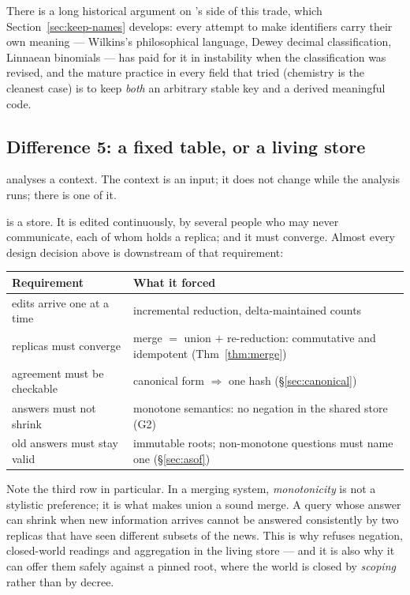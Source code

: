 There is a long historical argument on \odag{}'s side of this trade, which
Section~\ref{sec:keep-names} develops: every attempt to make identifiers carry
their own meaning --- Wilkins's philosophical language, Dewey decimal
classification, Linnaean binomials --- has paid for it in instability when the
classification was revised, and the mature practice in every field that tried
(chemistry is the cleanest case) is to keep \emph{both} an arbitrary stable
key and a derived meaningful code.

\subsection{Difference 5: a fixed table, or a living store}
\label{sec:mergeability}

\fca{} analyses a context. The context is an input; it does not change while
the analysis runs; there is one of it.

\odag{} is a store. It is edited continuously, by several people who may never
communicate, each of whom holds a replica; and it must converge. Almost every
design decision above is downstream of that requirement:

\begin{center}\small
\begin{tabularx}{\textwidth}{@{}p{4.6cm} X@{}}
\toprule
\textbf{Requirement} & \textbf{What it forced}\\
\midrule
edits arrive one at a time & incremental reduction, delta-maintained counts\\
replicas must converge & merge $=$ union $+$ re-reduction: commutative and
  idempotent (Thm~\ref{thm:merge})\\
agreement must be checkable & canonical form $\Rightarrow$ one hash
  (\S\ref{sec:canonical})\\
answers must not shrink & monotone semantics: no negation in the shared store
  (G2)\\
old answers must stay valid & immutable roots; non-monotone questions must
  name one (\S\ref{sec:asof})\\
\bottomrule
\end{tabularx}
\end{center}

Note the third row in particular. In a merging system, \emph{monotonicity} is
not a stylistic preference; it is what makes union a sound merge. A query
whose answer can shrink when new information arrives cannot be answered
consistently by two replicas that have seen different subsets of the news.
This is why \odag{} refuses negation, closed-world readings and aggregation in
the living store --- and it is also why it can offer them safely against a
pinned root, where the world is closed by \emph{scoping} rather than by
decree.

